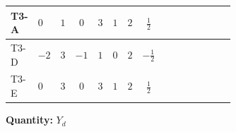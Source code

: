 \documentclass[8pt]{article}
\begin{document}
\begin{landscape}
\begin{longtable}{@{}llcccccc >{\raggedright\arraybackslash}p{0.21\linewidth} >{\raggedright\arraybackslash}p{0.21\linewidth} >{\raggedright\arraybackslash}p{0.21\linewidth}@{}}
\midrule
T3-A & $0$ & $1$ & $0$ & $3$ & $1$ & $2$ & $\frac{1}{2}$ & \scriptsize\adjustbox{max width=\linewidth}{$\begin{gathered} +\frac{3}{2} (\left({Y_d}\,\left({Y_d}\right)^{\dagger}\,{Y_d}\right)_{ij}-\left({Y_u}\,\left({Y_u}\right)^{\dagger}\,{Y_d}\right)_{ij})\end{gathered}$} & \scriptsize\adjustbox{max width=\linewidth}{$\begin{gathered} -\frac{9}{4} {g_2}^2 \left({Y_d}\right)_{ij}\end{gathered}$} & \scriptsize\adjustbox{max width=\linewidth}{$\begin{gathered} -8 {g_3}^2 \left({Y_d}\right)_{ij}\end{gathered}$} \\
\midrule
T3-D & $-2$ & $3$ & $-1$ & $1$ & $0$ & $2$ & $-\frac{1}{2}$ & \scriptsize\adjustbox{max width=\linewidth}{$\begin{gathered} +\frac{3}{2} (\left({Y_d}\,\left({Y_d}\right)^{\dagger}\,{Y_d}\right)_{ij}-\left({Y_u}\,\left({Y_u}\right)^{\dagger}\,{Y_d}\right)_{ij})\end{gathered}$} & \scriptsize\adjustbox{max width=\linewidth}{$\begin{gathered} -\frac{9}{4} {g_2}^2 \left({Y_d}\right)_{ij}\end{gathered}$} & \scriptsize\adjustbox{max width=\linewidth}{$\begin{gathered} -8 {g_3}^2 \left({Y_d}\right)_{ij}\end{gathered}$} \\
\midrule
T3-E & $0$ & $3$ & $0$ & $3$ & $1$ & $2$ & $\frac{1}{2}$ & \scriptsize\adjustbox{max width=\linewidth}{$\begin{gathered} +\frac{3}{2} (\left({Y_d}\,\left({Y_d}\right)^{\dagger}\,{Y_d}\right)_{ij}-\left({Y_u}\,\left({Y_u}\right)^{\dagger}\,{Y_d}\right)_{ij})\end{gathered}$} & \scriptsize\adjustbox{max width=\linewidth}{$\begin{gathered} -\frac{9}{4} {g_2}^2 \left({Y_d}\right)_{ij}\end{gathered}$} & \scriptsize\adjustbox{max width=\linewidth}{$\begin{gathered} -8 {g_3}^2 \left({Y_d}\right)_{ij}\end{gathered}$} \\
\midrule
\bottomrule
\end{longtable}
\clearpage
\noindent\textbf{Quantity: }$Y_d$\par\smallskip

\end{landscape}
\end{document}
